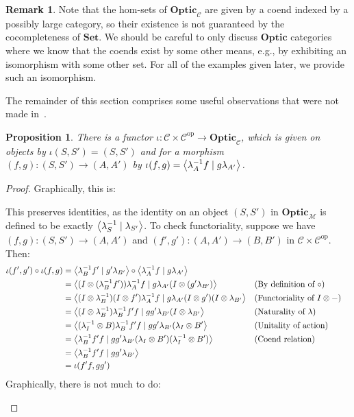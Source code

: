 \documentclass[11pt,a4paper]{article}
\theoremstyle{plain}
\newtheorem{proposition}[theorem]{Proposition}
\theoremstyle{definition}
\newtheorem{remark}[theorem]{Remark}
\newcommand{\C}{\mathscr{C}}
\newcommand{\M}{\mathscr{M}}
\newcommand{\Set}{\mathbf{Set}}
\newcommand{\Optic}{\mathbf{Optic}}
\newcommand{\op}{\mathrm{op}}
\newcommand{\rep}[2]{{\ensuremath \left\langle #1 \mid #2 \right\rangle}}
\begin{document}
\begin{remark}
  Note that the hom-sets of $\Optic_\C$ are given by a coend indexed by a possibly large category, so their existence is not guaranteed by the cocompleteness of $\Set$. We should be careful to only discuss $\Optic$ categories where we know that the coends exist by some other means, e.g., by exhibiting an isomorphism with some other set. For all of the examples given later, we provide such an isomorphism.
\end{remark}

The remainder of this section comprises some useful observations that were not made in~\cite{Doubles}.

\begin{proposition}
  There is a functor $\iota : \C \times \C^\op \to \Optic_\C$, which is given on objects by $\iota(S, S') = (S, S')$ and for a morphism $(f, g) : (S, S') \to (A, A')$ by $\iota(f, g) = \rep{\lambda_A^{-1} f}{g \lambda_{A'}}$.
\end{proposition}
\begin{proof}
  Graphically, this is:
  \begin{center}
    
  \end{center}

  This preserves identities, as the identity on an object $(S, S')$ in $\Optic_\M$ is defined to be exactly $\rep{\lambda^{-1}_S}{\lambda_{S'}}$. To check functoriality, suppose we have $(f, g) : (S, S') \to (A, A')$ and $(f', g') : (A, A') \to (B, B')$ in $\C \times \C^\op$. Then:
  \begin{align*}
    \iota(f', g') \circ \iota(f, g)
    &= \rep{\lambda^{-1}_B f'}{g' \lambda_{B'}} \circ \rep{\lambda^{-1}_A f}{g \lambda_{A'}} \\
    &= \rep{(I\otimes (\lambda^{-1}_B f'))\lambda^{-1}_A f}{g \lambda_{A'} (I\otimes (g' \lambda_{B'})} && \text{(By definition of $\circ$)}\\
    &= \rep{(I \otimes \lambda^{-1}_B) (I \otimes f')\lambda^{-1}_A f}{g \lambda_{A'} (I \otimes g')(I\otimes \lambda_{B'}} && \text{(Functoriality of $I \otimes -$)}\\
    &= \rep{(I\otimes \lambda^{-1}_B) \lambda^{-1}_B f' f}{g g' \lambda_{B'} (I\otimes \lambda_{B'}} && \text{(Naturality of $\lambda$)}\\
    &= \rep{(\lambda^{-1}_I \otimes B) \lambda^{-1}_B f' f}{g g' \lambda_{B'} (\lambda_I \otimes B'} && \text{(Unitality of action)} \\
    &= \rep{\lambda^{-1}_B f' f}{g g' \lambda_{B'} (\lambda_I \otimes B') (\lambda^{-1}_I \otimes B')} && \text{(Coend relation)}  \\
    &= \rep{\lambda^{-1}_B f'f}{g g' \lambda_{B'}} \\
    &= \iota(f'f, gg')
  \end{align*}
  Graphically, there is not much to do:
  \begin{center}
    
    \qquad \raisebox{0.3cm}{$=$} \qquad
    
  \end{center}

\end{proof}
\end{document}
